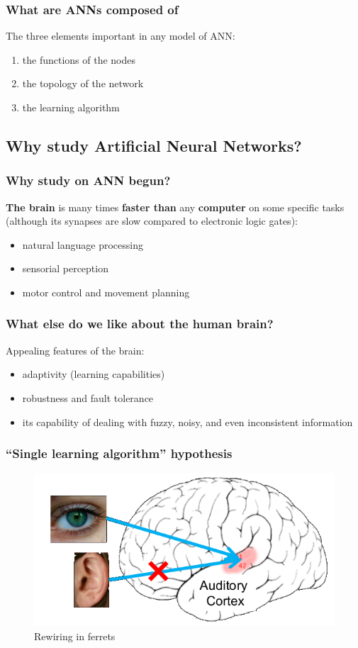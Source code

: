 \begin{frame}
  \frametitle{What are ANNs composed of}%
  The three elements important in any model of ANN:
  \begin{enumerate}
  \item the functions of the nodes
  \item the topology of the network
  \item the learning algorithm
  \end{enumerate}
\end{frame}

\subsection{Why study Artificial Neural Networks?}
\label{sec:why_study}

\begin{frame}
  \frametitle{Why study on ANN begun?}  \textbf{The brain} is many
  times \textbf{faster than} any \textbf{computer} on some specific
  tasks (although its synapses are slow compared to electronic logic
  gates):
  \begin{itemize}
  \item natural language processing
  \item sensorial perception
  \item motor control and movement planning
  \end{itemize}
\end{frame}

\begin{frame}
  \frametitle{What else do we like about the human brain?}  Appealing
  features of the brain:
  \begin{itemize}
  \item adaptivity (learning capabilities)
  \item robustness and fault tolerance
  \item its capability of dealing with fuzzy, noisy, and even
    inconsistent information
  \end{itemize}
\end{frame}

\begin{frame}
  \frametitle{``Single learning algorithm'' hypothesis}
  \begin{figure}[h]
    \centering
    \includegraphics[width=.7\textwidth]{graphics/rewiring.png}
    \caption{Rewiring in ferrets \cite{roe1992visual}}
    \label{fig:rewire}
  \end{figure}
\end{frame}

